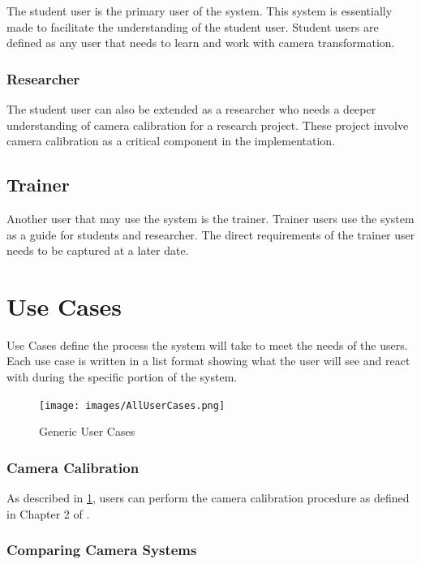\documentclass[11pt]{report}
\begin{document}
The student user is the primary user of the system. This system is essentially made to facilitate the understanding of the student user. Student users are defined as any user that needs to learn and work with camera transformation.  

\subsubsection{Researcher}

The student user can also be extended as a researcher who needs a deeper understanding of camera calibration for a research project. These project involve camera calibration as a critical component in the implementation. 

\subsection{Trainer}

Another user that may use the system is the trainer. Trainer users use the system as a guide for students and researcher. The direct requirements of the trainer user needs to be captured at a later date.

\section{Use Cases}

Use Cases define the process the system will take to meet the needs of the users. Each use case is written in a list format showing what the user will see and react with during the specific portion of the system. 

\begin{figure}[htp]
\centering
\texttt{[image: images/AllUserCases.png]}
\caption{Generic User Cases}
\label{fig:guc}
\end{figure}

\subsubsection{Camera Calibration}

As described in \ref{fig:guc}, users can perform the camera calibration procedure as defined in Chapter 2 of \cite{CC}. 


\subsubsection{Comparing Camera Systems} 
\end{document}

